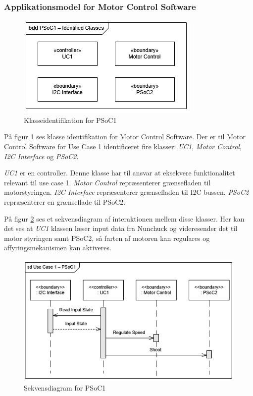 \subsubsection{Applikationsmodel for Motor Control Software}

\begin{figure}[H]
	\centering
	\includegraphics[scale=0.8]{Systemarkitektur/images/klasseIdentificationUC1PSoC1}
	\caption{Klasseidentifikation for PSoC1}
	\label{fig:klasseidentifikationUC1PSoC1}
\end{figure}

På figur \ref{fig:klasseidentifikationUC1PSoC1} ses klasse identifikation for Motor Control Software. Der er til Motor Control Software for Use Case 1 identificeret fire klasser: \textit{UC1}, \textit{Motor Control}, \textit{I2C Interface} og \textit{PSoC2}. \newline

\noindent \textit{UC1} er en controller. Denne klasse har til ansvar at eksekvere funktionalitet relevant til use case 1. \textit{Motor Control} repræsenterer grænsefladen til motorstyringen. \textit{I2C Interface} repræsenterer grænsefladen til I2C bussen. \textit{PSoC2} repræsenterer en grænseflade til PSoC2.

På figur \ref{fig:sekvensUC1PSoC1} ses et sekvensdiagram af interaktionen mellem disse klasser. Her kan det ses at \textit{UC1} klassen læser input data fra Nunchuck og videresender det til motor styringen samt PSoC2, så farten af motoren kan regulares og affyringsmekanismen kan aktiveres.

\begin{figure}[H]
	\centering
	\includegraphics[scale=0.8]{Systemarkitektur/images/UC1PSoC1SequenceDiagram}
	\caption{Sekvensdiagram for PSoC1}
	\label{fig:sekvensUC1PSoC1}
\end{figure}

